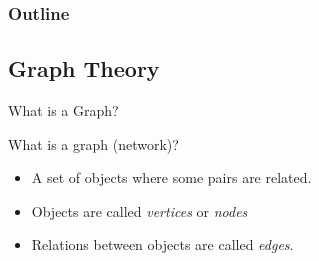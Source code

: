 \documentclass[unknownkeysallowed]{beamer}
\begin{document}
\begin{frame}
  \frametitle{Outline}
  \tableofcontents[currentsection]
\end{frame}

\subsection{Graph Theory}

\begin{frame}{What is a Graph?}

What is a graph (network)?

  \begin{itemize}
    \pause
  \item A set of objects where some pairs are related.
    \pause
  \item Objects are called {\it vertices} or {\it nodes}
    \pause
  \item Relations between objects are called {\it edges}. 
  \end{itemize}

\end{frame}
%
%
%
%
%
%
%
\end{document}
